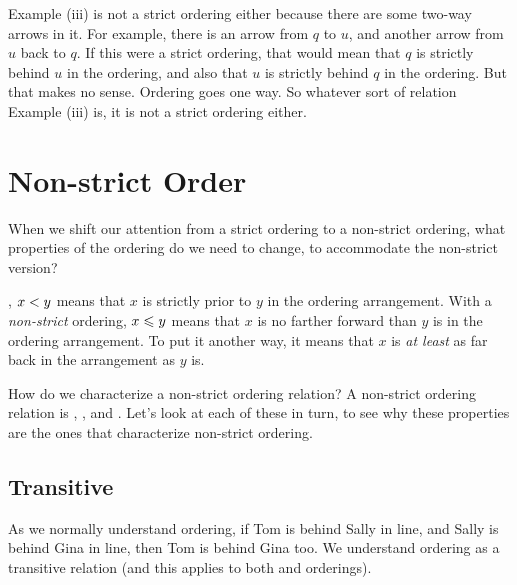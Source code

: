 \documentclass[../../../main.tex]{subfiles}
\begin{document}
Example (iii) is not a strict ordering either because there are some two-way arrows in it. For example, there is an arrow from $q$ to $u$, and another arrow from $u$ back to $q$. If this were a strict ordering, that would mean that $q$ is strictly behind $u$ in the ordering, and also that $u$ is strictly behind $q$ in the ordering. But that makes no sense. Ordering goes one way. So whatever sort of relation Example (iii) is, it is not a strict ordering either.


\section{Non-strict Order}
\label{sec:non-strict-order}

\begin{ponder}
  When we shift our attention from a strict ordering to a non-strict ordering, what properties of the ordering do we need to change, to accommodate the non-strict version? 
\end{ponder}

, $x \strictorder/ y$ means that $x$ is strictly prior to $y$ in the ordering arrangement. With a \emph{non-strict} ordering, $x \order/ y$ means that $x$ is no farther forward than $y$ is in the ordering arrangement. To put it another way, it means that $x$ is \emph{at least} as far back in the arrangement as $y$ is.

How do we characterize a non-strict ordering relation? A non-strict ordering relation is , , and . Let's look at each of these in turn, to see why these properties are the ones that characterize non-strict ordering.


\subsection{Transitive}

\begin{aside}
  \begin{remark}
    As we normally understand ordering, if Tom is behind Sally in line, and Sally is behind Gina in line, then Tom is behind Gina too. We understand ordering as a transitive relation (and this applies to both  and  orderings).
  \end{remark}
\end{aside}
\end{document}
